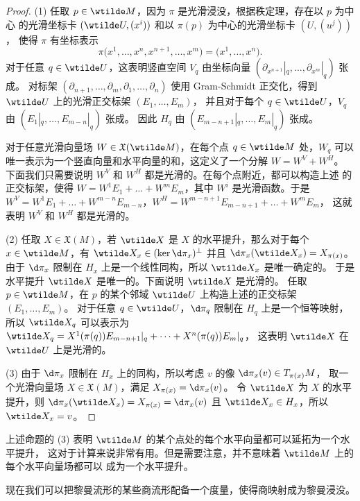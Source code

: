 \begin{proof}
  (1) 任取 $p\in \wtilde M$，因为 $\pi$ 是光滑浸没，根据秩定理，存在以 $p$ 为中心
  的光滑坐标卡 $(\wtilde U,(x^i))$ 和以 $\pi(p)$ 为中心的光滑坐标卡 $(U,(u^j))$，
  使得 $\pi$ 有坐标表示
  \[
    \pi\bigl(x^1,\dots,x^n,x^{n+1},\dots,x^m\bigr)=\bigl(
      x^1,\dots,x^n
    \bigr).
  \]
  对于任意 $q\in \wtilde U$，这表明竖直空间 $V_q$ 由坐标向量 $(\partial_{x^{n+1}}|_q,\dots,\partial_{x^m}|_q)$ 张成。
  对标架 $(\partial_{n+1},\dots,\partial_m,\partial_1,\dots,\partial_n)$
  使用 Gram-Schmidt 正交化，得到 $\wtilde U$ 上的光滑正交标架 $(E_1,\dots,E_m)$，
  并且对于每个 $q\in \wtilde U$，$V_q$ 由 $(E_1|_q,\dots,E_{m-n}|_q)$ 张成。
  因此 $H_q$ 由 $(E_{m-n+1}|_q,\dots,E_m|_q)$ 张成。

  对于任意光滑向量场 $W\in \mathfrak X(\wtilde M)$，在每个点 $q\in\wtilde M$
  处，$W_q$ 可以唯一表示为一个竖直向量和水平向量的和，这定义了一个分解 $W=W^V+W^H$。
  下面我们只需要说明 $W^V$ 和 $W^H$ 都是光滑的。在每个点附近，都可以构造上述
  的正交标架，使得 $W=W^1E_1+\dots+W^mE_m$，其中 $W^i$ 是光滑函数。于是
  $W^V=W^1E_1+\dots+W^{m-n}E_{m-n}$，$W^H=W^{m-n+1}E_{m-n+1}+\dots+W^mE_m$，
  这就表明 $W^V$ 和 $W^H$ 都是光滑的。

  (2) 任取 $X\in\mathfrak X(M)$，若 $\wtilde X$ 是 $X$ 的水平提升，那么对于每个
  $x\in \wtilde M$，有 $\wtilde X_x\in (\ker\d\pi_x)^\bot$ 并且
  $\d\pi_x(\wtilde X_x)=X_{\pi(x)}$。由于 $\d\pi_x$ 限制在 $H_x$ 上是一个线性同构，所以 $\wtilde X_x$ 是唯一确定的。
  于是水平提升 $\wtilde X$ 是唯一的。下面说明 $\wtilde X$ 是光滑的。
  任取 $p\in \wtilde M$，在 $p$ 的某个邻域 $\wtilde U$ 上构造上述的正交标架 $(E_1,\dots,E_m)$。
  对于任意 $q\in\wtilde U$，$\d\pi_q$ 限制在 $H_q$ 上是一个恒等映射，
  所以 $\wtilde X_q$ 可以表示为 $\wtilde X_q=X^1(\pi(q))E_{m-n+1}|_q+\cdots+X^n(\pi(q))E_m|_q$，
  这表明 $\wtilde X$ 在 $\wtilde U$ 上是光滑的。

  (3) 由于 $\d\pi_x$ 限制在 $H_x$ 上的同构，所以考虑 $v$ 的像 $\d\pi_x(v)\in T_{\pi(x)}M$，
  取一个光滑向量场 $X\in\mathfrak X(M)$，满足 $X_{\pi(x)}=\d\pi_x(v)$。
  令 $\wtilde X$ 为 $X$ 的水平提升，则 $\d\pi_x(\wtilde X_x)=X_{\pi(x)}=\d\pi_x(v)$
  且 $\wtilde X_x\in H_x$，所以 $\wtilde X_x=v$。
\end{proof}

上述命题的 (3) 表明 $\wtilde M$ 的某个点处的每个水平向量都可以延拓为一个水平提升，
这对于计算来说非常有用。但是需要注意，并不意味着 $\wtilde M$ 上的每个水平向量场都可以
成为一个水平提升。

现在我们可以把黎曼流形的某些商流形配备一个度量，使得商映射成为黎曼浸没。

